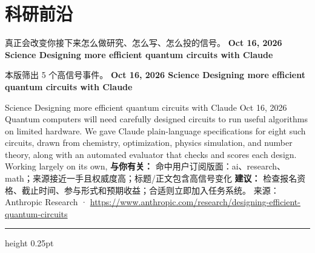\documentclass[10.5pt]{ctexart}
\begin{document}
\section*{科研前沿}
{\color{ormuted} 真正会改变你接下来怎么做研究、怎么写、怎么投的信号。}
\vspace{2mm}
{\LARGE\bfseries Oct 16, 2026 Science Designing more efficient quantum circuits with Claude}\par
\vspace{1mm}
{\color{ormuted} 本版筛出 5 个高信号事件。}
\vspace{3mm}
{\Large\bfseries Oct 16, 2026 Science Designing more efficient quantum circuits with Claude}\par
Science Designing more efficient quantum circuits with Claude Oct 16, 2026 Quantum computers will need carefully designed circuits to run useful algorithms on limited hardware. We gave Claude plain-language specifications for eight such circuits, drawn from chemistry, optimization, physics simulation, and number theory, along with an automated evaluator that checks and scores each design. Working largely on its own, 
\textbf{与你有关：} 命中用户订阅版面：ai、research、math；来源接近一手且权威度高；标题/正文包含高信号变化
\textbf{建议：} 检查报名资格、截止时间、参与形式和预期收益；合适则立即加入任务系统。
{\footnotesize\color{ormuted} 来源：Anthropic Research · \url{https://www.anthropic.com/research/designing-efficient-quantum-circuits}}
\vspace{4mm}
\hrule height 0.25pt
\vspace{3mm}
\end{document}
